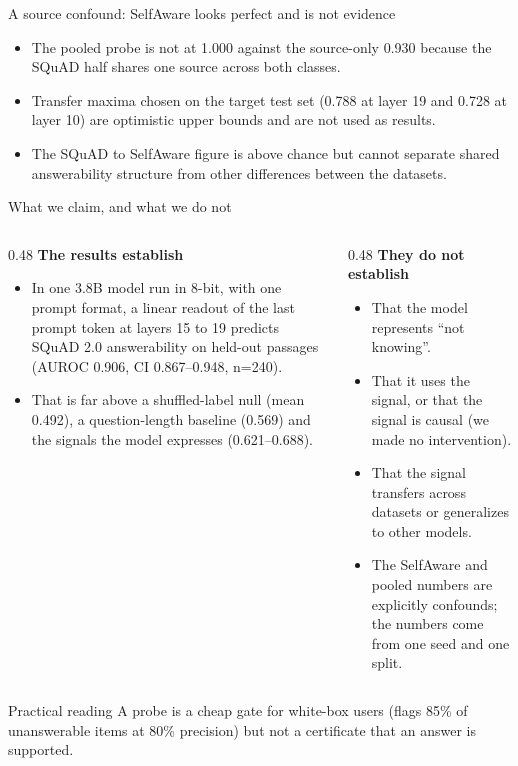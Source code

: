 \documentclass[aspectratio=169,11pt,usepdftitle=false]{beamer}
\begin{document}
\begin{frame}{A source confound: SelfAware looks perfect and is not evidence}
{\begin{itemize}
\item The pooled probe is not at 1.000 against the source-only 0.930 because the SQuAD half shares one source across both classes.
\item Transfer maxima chosen on the target test set (0.788 at layer 19 and 0.728 at layer 10) are optimistic upper bounds and are not used as results.
\item The SQuAD to SelfAware figure is above chance but cannot separate shared answerability structure from other differences between the datasets.
\end{itemize}}
\end{frame}

\begin{frame}{What we claim, and what we do not}
\footnotesize
\begin{columns}[T]
\begin{column}{0.48\textwidth}
\textbf{The results establish}
\begin{itemize}
\item In one 3.8B model run in 8-bit, with one prompt format, a linear readout of the last prompt token at layers 15 to 19 predicts SQuAD 2.0 answerability on held-out passages (AUROC 0.906, CI 0.867--0.948, n=240).
\item That is far above a shuffled-label null (mean 0.492), a question-length baseline (0.569) and the signals the model expresses (0.621--0.688).
\end{itemize}
\end{column}
\begin{column}{0.48\textwidth}
\textbf{They do not establish}
\begin{itemize}
\item That the model represents ``not knowing''.
\item That it uses the signal, or that the signal is causal (we made no intervention).
\item That the signal transfers across datasets or generalizes to other models.
\item The SelfAware and pooled numbers are explicitly confounds; the numbers come from one seed and one split.
\end{itemize}
\end{column}
\end{columns}
\begin{alertblock}{Practical reading}
A probe is a cheap gate for white-box users (flags 85\% of unanswerable items at 80\% precision) but not a certificate that an answer is supported.

\end{alertblock}
\end{frame}
\end{document}

